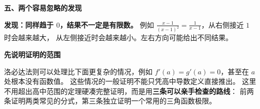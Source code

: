 \begin{explanationbox}
\medskip
\textbf{\textcolor{CExplanation}{五、两个容易忽略的发现}}

\textbf{发现：同样趋于 $0$，结果不一定是有限数。}
例如 $\frac{x-1}{(x-1)^2}=\frac1{x-1}$，从右侧接近 $1$ 时会越来越大，
从左侧接近时会越来越小。左右方向可能给出不同结果。




\textbf{\textcolor{CProof}{先说明证明的范围}}

洛必达法则可以处理比下面更复杂的情况，例如 $f'(a)=g'(a)=0$，甚至在 $a$ 处根本没有函数值。
这些情况的一般证明不能只凭高中导数定义直接推出。
这里不用超出高中范围的定理硬凑完整证明，而是用\textbf{三条可以亲手检查的路线}：
前两条证明两类常见的分式，第三条独立证明一个常用的三角函数极限。

\medskip

\end{explanationbox}

